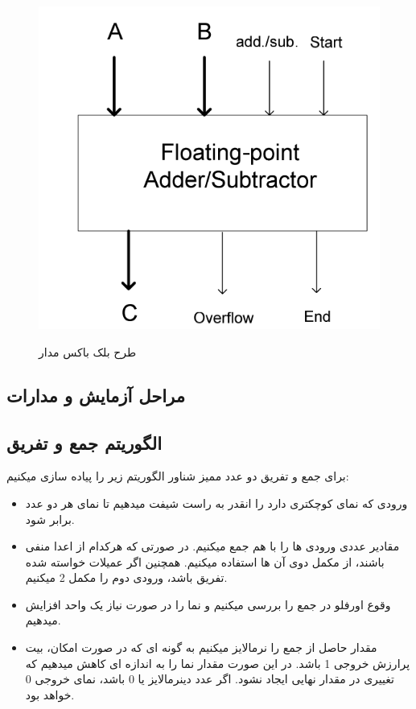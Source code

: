 \documentclass[twoside]{article}
\begin{document}
	\begin{figure}[h!]
		\begin{center}
			\includegraphics[scale=0.4]{blackbox}‎
			\caption{طرح بلک باکس مدار}
		\end{center}
	\end{figure} 

	\newpage
	\subsection*{مراحل آزمایش و مدارات}
	\subsection*{الگوریتم جمع و تفریق}	
	برای جمع و تفریق دو عدد ممیز شناور الگوریتم زیر را پیاده سازی میکنیم:
	\begin{itemize}
		\item 
		ورودی که نمای کوچکتری دارد را انقدر به راست شیفت میدهیم تا نمای هر دو عدد برابر شود.
		\item
		مقادیر عددی ورودی ها را با هم جمع میکنیم. در صورتی که هرکدام از اعدا منفی باشند، از مکمل دوی آن ها استفاده میکنیم. همچنین اگر عمیلات خواسته شده تفریق باشد، ورودی دوم را مکمل 2 میکنیم.
		\item
		وقوع اورفلو در جمع را بررسی میکنیم و نما را در صورت نیاز یک واحد افزایش میدهیم.
		\item
		 مقدار حاصل از جمع را نرمالایز میکنیم به گونه ای که در صورت امکان، بیت پرارزش خروجی 1 باشد. در این صورت مقدار نما را به اندازه ای کاهش میدهیم که تغییری در مقدار نهایی ایجاد نشود. اگر عدد دینرمالایز یا 0 باشد، نمای خروجی 0 خواهد بود.
	\end{itemize}
\end{document}
